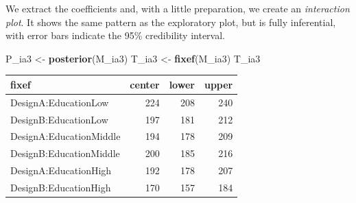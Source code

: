 \documentclass[]{svmono}
\newenvironment{Shaded}{\begin{snugshade}}{\end{snugshade}}
\newcommand{\KeywordTok}[1]{\textcolor[rgb]{0.13,0.29,0.53}{\textbf{#1}}}
\newcommand{\DataTypeTok}[1]{\textcolor[rgb]{0.13,0.29,0.53}{#1}}
\newcommand{\DecValTok}[1]{\textcolor[rgb]{0.00,0.00,0.81}{#1}}
\newcommand{\StringTok}[1]{\textcolor[rgb]{0.31,0.60,0.02}{#1}}
\newcommand{\OperatorTok}[1]{\textcolor[rgb]{0.81,0.36,0.00}{\textbf{#1}}}
\newcommand{\NormalTok}[1]{#1}
\theoremstyle{definition}
\theoremstyle{definition}
\theoremstyle{definition}
\theoremstyle{remark}
\begin{document}
We extract the coefficients and, with a little preparation, we create an
\emph{interaction plot}. It shows the same pattern as the exploratory
plot, but is fully inferential, with error bars indicate the 95\%
credibility interval.

\begin{Shaded}
\begin{Highlighting}[]
\NormalTok{P_ia3 <-}\StringTok{ }\KeywordTok{posterior}\NormalTok{(M_ia3)}
\NormalTok{T_ia3 <-}\StringTok{ }\KeywordTok{fixef}\NormalTok{(M_ia3)}
\NormalTok{T_ia3}
\end{Highlighting}
\end{Shaded}

\begin{longtable}[]{@{}lrrr@{}}
\toprule
fixef & center & lower & upper\tabularnewline
\midrule
\endhead
DesignA:EducationLow & 224 & 208 & 240\tabularnewline
DesignB:EducationLow & 197 & 181 & 212\tabularnewline
DesignA:EducationMiddle & 194 & 178 & 209\tabularnewline
DesignB:EducationMiddle & 200 & 185 & 216\tabularnewline
DesignA:EducationHigh & 192 & 178 & 207\tabularnewline
DesignB:EducationHigh & 170 & 157 & 184\tabularnewline
\bottomrule
\end{longtable}

\begin{Shaded}
\end{Shaded}
\end{document}
